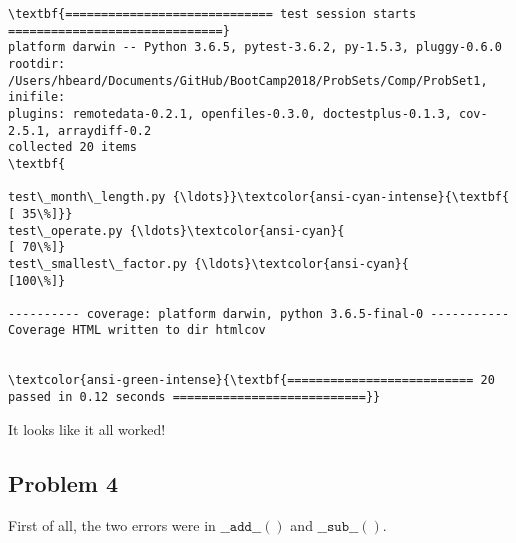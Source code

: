 \documentclass[11pt]{article}
\begin{document}
    \begin{Verbatim}[commandchars=\\\{\}]
\textbf{============================= test session starts ==============================}
platform darwin -- Python 3.6.5, pytest-3.6.2, py-1.5.3, pluggy-0.6.0
rootdir: /Users/hbeard/Documents/GitHub/BootCamp2018/ProbSets/Comp/ProbSet1, inifile:
plugins: remotedata-0.2.1, openfiles-0.3.0, doctestplus-0.1.3, cov-2.5.1, arraydiff-0.2
collected 20 items                                                             \textbf{

test\_month\_length.py {\ldots}}\textcolor{ansi-cyan-intense}{\textbf{                                             [ 35\%]}}
test\_operate.py {\ldots}\textcolor{ansi-cyan}{                                                  [ 70\%]}
test\_smallest\_factor.py {\ldots}\textcolor{ansi-cyan}{                                           [100\%]}

---------- coverage: platform darwin, python 3.6.5-final-0 -----------
Coverage HTML written to dir htmlcov


\textcolor{ansi-green-intense}{\textbf{========================== 20 passed in 0.12 seconds ===========================}}

    \end{Verbatim}

    It looks like it all worked!

    \subsection*{Problem 4}\label{problem-4}

    First of all, the two errors were in \(\_\_\mathtt{add}\_\_\mathtt{()}\)
and \(\_\_\mathtt{sub}\_\_\mathtt{()}\).
\end{document}
